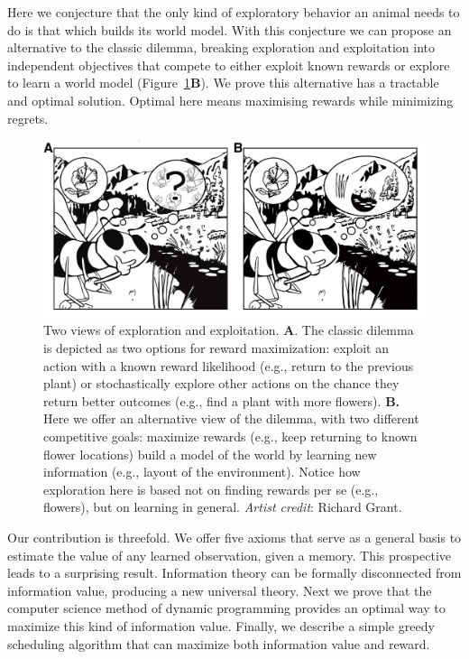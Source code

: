 \documentclass[12pt]{article}
\begin{document}
Here we conjecture that the only kind of exploratory behavior an animal needs to do is that which builds its world model. With this conjecture we can propose an alternative to the classic dilemma, breaking exploration and exploitation into independent objectives that compete to either exploit known rewards or explore to learn a world model (Figure~\ref{fig:f1}\textbf{B}). We prove this alternative has a tractable and optimal solution. Optimal here means maximising rewards while minimizing regrets.

\begin{figure}
	[tbhp] \centering 
	\includegraphics[width=.7\linewidth]{figures/fig1.png} 
	\caption{\label{fig:f1} Two views of exploration and exploitation. \textbf{A}. The classic dilemma is depicted as two options for reward maximization: exploit an action with a known reward likelihood (e.g., return to the previous plant) or stochastically explore other actions on the chance they return better outcomes (e.g., find a plant with more flowers). \textbf{B.} Here we offer an alternative view of the dilemma, with two different competitive goals: maximize rewards (e.g., keep returning to known flower locations)  build a model of the world by learning new information (e.g., layout of the environment). Notice how exploration here is based not on finding rewards per se (e.g., flowers), but on learning in general. \textit{Artist credit}: Richard Grant.}
\end{figure}

Our contribution is threefold. We offer five axioms that serve as a general basis to estimate the value of any learned observation, given a memory. This prospective leads to a surprising result. Information theory can be formally disconnected from information value, producing a new universal theory. Next we prove that the computer science method of dynamic programming \cite{Bellmann1954,Sutton2018} provides an optimal way to maximize this kind of information value. Finally, we describe a simple greedy scheduling algorithm that can maximize both information value and reward.
\end{document}

